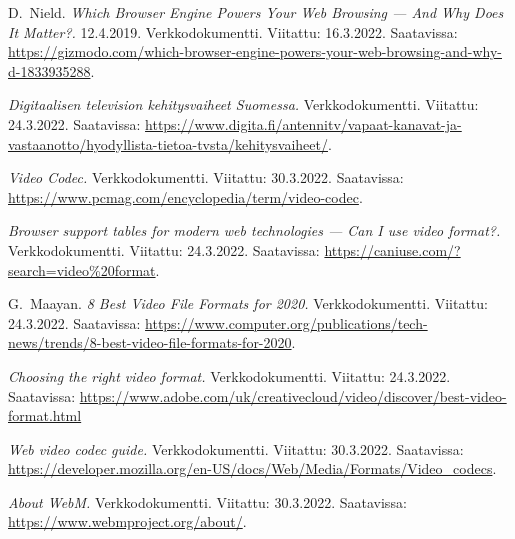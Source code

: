 \documentclass[finnish, 12pt, a4paper, elec, utf8, a-1b, online]{aaltothesis}
\begin{document}
\begin{thebibliography}{99}
    D.\ Nield.
    \textit{Which Browser Engine Powers Your Web Browsing — And Why Does It Matter?.}
    12.4.2019.
    Verkkodokumentti.
    Viitattu: 16.3.2022.
    Saatavissa: \url{https://gizmodo.com/which-browser-engine-powers-your-web-browsing-and-why-d-1833935288}.

    \textit{Digitaalisen television kehitysvaiheet Suomessa.}
    Verkkodokumentti.
    Viitattu: 24.3.2022.
    Saatavissa: \url{https://www.digita.fi/antennitv/vapaat-kanavat-ja-vastaanotto/hyodyllista-tietoa-tvsta/kehitysvaiheet/}.

    \textit{Video Codec.}
    Verkkodokumentti.
    Viitattu: 30.3.2022.
    Saatavissa: \url{https://www.pcmag.com/encyclopedia/term/video-codec}.

    \textit{Browser support tables for modern web technologies — Can I use video format?.}
    Verkkodokumentti.
    Viitattu: 24.3.2022.
    Saatavissa: \url{https://caniuse.com/?search=video%20format}.

    G.\ Maayan.
    \textit{8 Best Video File Formats for 2020.}
    Verkkodokumentti.
    Viitattu: 24.3.2022.
    Saatavissa: \url{https://www.computer.org/publications/tech-news/trends/8-best-video-file-formats-for-2020}.

    \textit{Choosing the right video format.}
    Verkkodokumentti.
    Viitattu: 24.3.2022.
    Saatavissa: \url{https://www.adobe.com/uk/creativecloud/video/discover/best-video-format.html}

    \textit{Web video codec guide.}
    Verkkodokumentti.
    Viitattu: 30.3.2022.
    Saatavissa: \url{https://developer.mozilla.org/en-US/docs/Web/Media/Formats/Video_codecs}.

    \textit{About WebM.}
    Verkkodokumentti.
    Viitattu: 30.3.2022.
    Saatavissa: \url{https://www.webmproject.org/about/}.



\end{thebibliography}
\end{document}
